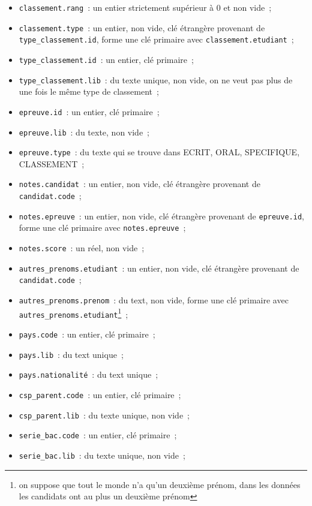 \documentclass[12pt]{article}
\begin{document}
\begin{itemize}[label=\textbullet]
            \item \texttt{classement.rang}~: un entier strictement supérieur à 0 et non vide~;
            \item \texttt{classement.type}~: un entier, non vide, clé étrangère provenant de \texttt{type\_classement.id}, forme une clé primaire avec \texttt{classement.etudiant}~;
            \item \texttt{type\_classement.id}~: un entier, clé primaire~;
            \item \texttt{type\_classement.lib}~: du texte unique, non vide, on ne veut pas plus de une fois le même type de classement~;
            \item \texttt{epreuve.id}~: un entier, clé primaire~;
            \item \texttt{epreuve.lib}~: du texte, non vide~;
            \item \texttt{epreuve.type}~: du texte qui se trouve dans ECRIT, ORAL, SPECIFIQUE, CLASSEMENT~;
            \item \texttt{notes.candidat}~: un entier, non vide, clé étrangère provenant de \texttt{candidat.code}~;
            \item \texttt{notes.epreuve}~: un entier, non vide, clé étrangère provenant de \texttt{epreuve.id}, forme une clé primaire avec \texttt{notes.epreuve}~;
            \item \texttt{notes.score}~: un réel, non vide~;
            \item \texttt{autres\_prenoms.etudiant}~: un entier, non vide, clé étrangère provenant de \texttt{candidat.code}~;
            \item \texttt{autres\_prenoms.prenom}~: du text, non vide, forme une clé primaire avec \texttt{autres\_prenoms.etudiant}\footnote{on suppose que tout le monde n'a qu'un deuxième prénom, dans les données les candidats ont au plus un deuxième prénom}~;
            \item \texttt{pays.code}~: un entier, clé primaire~;
            \item \texttt{pays.lib}~: du text unique~;
            \item \texttt{pays.nationalité}~: du text unique~;
            \item \texttt{csp\_parent.code}~: un entier, clé primaire~;
            \item \texttt{csp\_parent.lib}~: du texte unique, non vide~;
            \item \texttt{serie\_bac.code}~: un entier, clé primaire~;
            \item \texttt{serie\_bac.lib}~: du texte unique, non vide~;

\end{itemize}
\end{document}
